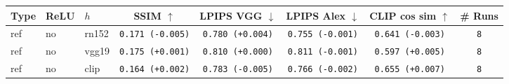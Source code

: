\begin{tabular}{|l|l|l|c|c|c|c|c|}
\hline
Type & ReLU & $h$ & SSIM $\uparrow$ & LPIPS VGG $\downarrow$ & LPIPS Alex $\downarrow$ & CLIP cos sim $\uparrow$ & \# Runs \\
\hline
ref & no & rn152 & \texttt{0.171 {\color{red}(-0.005)}} & \texttt{0.780 {\color{red}(+0.004)}} & \texttt{0.755 {\color{green}(-0.001)}} & \texttt{0.641 {\color{red}(-0.003)}} & \texttt{8} \\
\hline
ref & no & vgg19 & \texttt{0.175 {\color{green}(+0.001)}} & \texttt{0.810 {\color{black}(+0.000)}} & \texttt{0.811 {\color{green}(-0.001)}} & \texttt{0.597 {\color{green}(+0.005)}} & \texttt{8} \\
\hline
ref & no & clip & \texttt{0.164 {\color{green}(+0.002)}} & \texttt{0.783 {\color{green}(-0.005)}} & \texttt{0.766 {\color{green}(-0.002)}} & \texttt{0.655 {\color{green}(+0.007)}} & \texttt{8} \\
\hline
\end{tabular}
